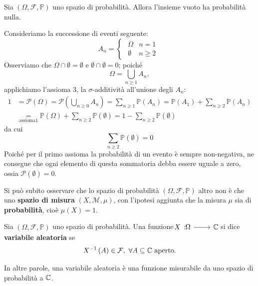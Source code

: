 \begin{proposition}
	Sia $\left(\Omega,\mathcal{F},\mathbb{P}\right)$ uno spazio di probabilità. Allora l'insieme vuoto ha probabilità nulla.
\end{proposition}
\begin{demonstration}
	Consideriamo la successione di eventi seguente:
	\begin{equation*}
		A_n=\begin{cases}
			\begin{array}{ll}
				\Omega&n=1\\
				\emptyset&n\geq2
			\end{array}
		\end{cases}
	\end{equation*}
Osserviamo che $\Omega\cap \emptyset=\emptyset$ e $\emptyset\cap\emptyset=0$; poiché
\begin{equation*}
	\Omega=\bigcup_{n\geq 1}A_n,
\end{equation*}
applichiamo l'assioma 3, la $\sigma$-additività all'unione degli $A_n$:
\begin{align*}
	1&=\mathcal{P}\left(\Omega\right)=\mathcal{P}\left(\bigcup_{n\geq 0}A_n\right)=\sum_{n\geq 1}\mathbb{P}\left(A_n\right)=\mathbb{P}\left(A_1\right)+\sum_{n\geq2}\mathbb{P}\left(A_n\right)\\
	&\underset{\text{assioma} 1}{=}\mathbb{P}\left(\Omega\right)+\sum_{n\geq 2}\mathbb{P}\left(\emptyset\right)=1-\sum_{n\geq 2}\mathbb{P}\left(\emptyset\right)
\end{align*}
da cui
\begin{equation*}
	\sum_{n\geq 2}\mathbb{P}\left(\emptyset\right)=0
\end{equation*}
Poiché per il primo assioma la probabilità di un evento è sempre non-negativa, ne consegue che ogni elemento di questa sommatoria debba essere uguale a zero, ossia $\mathcal{P}\left(\emptyset\right)=0$.
\end{demonstration}
Si può subito osservare che lo spazio di probabilità $\left(\Omega,\mathcal{F},\mathbb{P}\right)$ altro non è che uno \textbf{spazio di misura} $\left(X,\mathcal{M},\mu\right)$, con l'ipotesi aggiunta che la misura $\mu$ sia di \textbf{probabilità}, cioè $\mu\left(X\right)=1$.
\begin{define}
	Sia $\left(\Omega,\mathcal{F},\mathbb{P}\right)$ uno spazio di probabilità. Una funzione $\funz{X}{\Omega}{\complexset}$ si dice \textbf{variabile aleatoria} se \begin{equation}
		X^{-1}\left(A\right)\in\mathcal{F},\ \forall A\subseteq \mathbb{C}\text{ aperto.}
	\end{equation}
\end{define}
In altre parole, una variabile aleatoria è una funzione misurabile da uno spazio di probabilità a $\mathbb{C}$.
